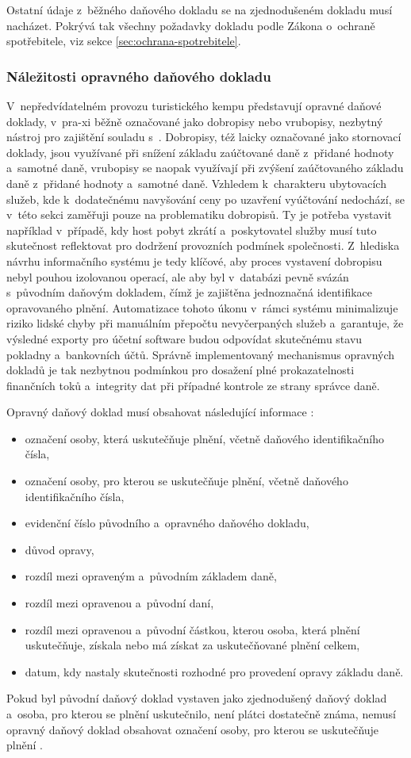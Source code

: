 Ostatní údaje z~běžného daňového dokladu se na zjednodušeném dokladu musí nacházet.
Pokrývá tak všechny požadavky dokladu podle Zákona o~ochraně spotřebitele, viz sekce \ref{sec:ochrana-spotrebitele}.

\subsubsection{Náležitosti opravného daňového dokladu}
V~nepředvídatelném provozu turistického kempu představují opravné daňové doklady, v~pra-xi běžně označované jako dobropisy nebo vrubopisy, nezbytný nástroj pro zajištění souladu s~\cite[\S~42]{cz-2004-235}.
Dobropisy, též laicky označované jako stornovací doklady, jsou využívané při snížení základu zaúčtované daně z~přidané hodnoty a~samotné daně, vrubopisy se naopak využívají při zvýšení zaúčtovaného
základu daně z~přidané hodnoty a~samotné daně.
Vzhledem k~charakteru ubytovacích služeb, kde k~dodatečnému navyšování ceny po uzavření vyúčtování nedochází, se v~této sekci zaměřuji pouze na problematiku dobropisů.
Ty je potřeba vystavit například v~případě, kdy host pobyt zkrátí a~poskytovatel služby musí tuto skutečnost reflektovat pro dodržení provozních podmínek společnosti.
Z~hlediska návrhu informačního systému je tedy klíčové, aby proces vystavení dobropisu nebyl pouhou izolovanou operací, ale aby byl v~databázi pevně svázán s~původním daňovým dokladem, čímž je zajištěna jednoznačná identifikace opravovaného plnění.
Automatizace tohoto úkonu v~rámci systému minimalizuje riziko lidské chyby při manuálním přepočtu nevyčerpaných služeb a~garantuje, že výsledné exporty pro účetní software budou odpovídat skutečnému stavu pokladny a~bankovních účtů.
Správně implementovaný mechanismus opravných dokladů je tak nezbytnou podmínkou pro dosažení plné prokazatelnosti finančních toků a~integrity dat při případné kontrole ze strany správce daně.

Opravný daňový doklad musí obsahovat následující informace \cite[\S~45 1]{cz-2004-235}:
\begin{itemize}
    \item označení osoby, která uskutečňuje plnění, včetně daňového identifikačního čísla,
    \item označení osoby, pro kterou se uskutečňuje plnění, včetně daňového identifikačního čísla,
    \item evidenční číslo původního a~opravného daňového dokladu,
    \item důvod opravy,
    \item rozdíl mezi opraveným a~původním základem daně,
    \item rozdíl mezi opravenou a~původní daní,
    \item rozdíl mezi opravenou a~původní částkou, kterou osoba, která plnění uskutečňuje, získala nebo má získat za uskutečňované plnění celkem,
    \item datum, kdy nastaly skutečnosti rozhodné pro provedení opravy základu daně.
\end{itemize}
Pokud byl původní daňový doklad vystaven jako zjednodušený daňový doklad a~osoba, pro kterou se plnění uskutečnilo, není plátci dostatečně známa, nemusí opravný daňový doklad obsahovat označení osoby, pro kterou se uskutečňuje plnění \cite[\S~45 2]{cz-2004-235}.

